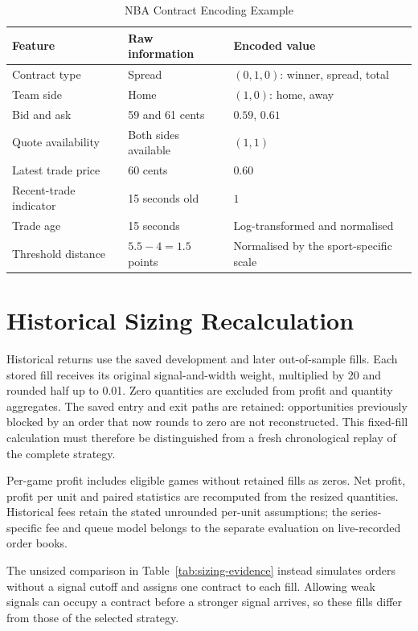 \documentclass[12pt,a4paper,oneside]{report}
\begin{document}
\begin{table}[htbp]\centering
\caption{NBA Contract Encoding Example}
\label{tab:encoding-example}
\begin{tabular}{@{}p{}p{}p{}@{}}
\toprule
Feature & Raw information & Encoded value \\
\midrule
Contract type & Spread & $(0,1,0)$: winner, spread, total \\
Team side & Home & $(1,0)$: home, away \\
Bid and ask & 59 and 61 cents & $0.59$, $0.61$ \\
Quote availability & Both sides available & $(1,1)$ \\
Latest trade price & 60 cents & $0.60$ \\
Recent-trade indicator & 15 seconds old & $1$ \\
Trade age & 15 seconds & Log-transformed and normalised \\
Threshold distance & $5.5-4=1.5$ points & Normalised by the sport-specific scale \\
\bottomrule\end{tabular}
\end{table}

\section{Historical Sizing Recalculation}\label{sec:historical-resizing}
Historical returns use the saved development and later out-of-sample fills.
Each stored fill receives its original signal-and-width
weight, multiplied by 20 and rounded half up to 0.01. Zero quantities are
excluded from profit and quantity aggregates. The saved entry and exit paths
are retained: opportunities previously blocked by an order that now rounds
to zero are not reconstructed. This fixed-fill calculation must therefore be
distinguished from a fresh chronological replay of the complete strategy.

Per-game profit includes eligible games without retained fills as zeros.
Net profit, profit per unit and paired statistics are
recomputed from the resized quantities. Historical fees retain the stated
unrounded per-unit assumptions; the series-specific fee and queue model belongs
to the separate evaluation on live-recorded order books.

The unsized comparison in Table~\ref{tab:sizing-evidence} instead simulates
orders without a signal cutoff and assigns one contract to each fill. Allowing
weak signals can occupy a contract before a stronger signal arrives, so these
fills differ from those of the selected strategy.
\end{document}
